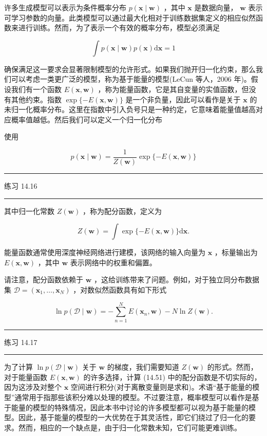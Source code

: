 \documentclass[10pt]{report}
\newcommand{\HRule}{\begin{center}\rule{0.9\linewidth}{0.2mm}\end{center}}
\begin{document}
许多生成模型可以表示为条件概率分布 \(p\left( {\mathbf{x} \mid  \mathbf{w}}\right)\) ，其中 \(\mathbf{x}\) 是数据向量， \(\mathbf{w}\) 表示可学习参数的向量。此类模型可以通过最大化相对于训练数据集定义的相应似然函数来进行训练。然而，为了表示一个有效的概率分布，模型必须满足

\[
\int p\left( {\mathbf{x} \mid  \mathbf{w}}\right) p\left( \mathbf{x}\right) \mathrm{d}\mathbf{x} = 1 \tag{14.49}
\]

确保满足这一要求会显著限制模型的允许形式。如果我们抛开归一化约束，那么我们可以考虑一类更广泛的模型，称为基于能量的模型(LeCun 等人，2006 年)。假设我们有一个函数 \(E\left( {\mathbf{x},\mathbf{w}}\right)\) ，称为能量函数，它是其自变量的实值函数，但没有其他约束。指数 \(\exp \{  - E\left( {\mathbf{x},\mathbf{w}}\right) \}\) 是一个非负量，因此可以看作是关于 \(\mathbf{x}\) 的未归一化概率分布。这里在指数中引入负号只是一种约定，它意味着能量值越高对应概率值越低。然后我们可以定义一个归一化分布

使用

\[
p\left( {\mathbf{x} \mid  \mathbf{w}}\right)  = \frac{1}{Z\left( \mathbf{w}\right) }\exp \{  - E\left( {\mathbf{x},\mathbf{w}}\right) \}  \tag{14.50}
\]

\HRule

练习 14.16

\HRule

其中归一化常数 \(Z\left( \mathbf{w}\right)\) ，称为配分函数，定义为

\[
Z\left( \mathbf{w}\right)  = \int \exp \{  - E\left( {\mathbf{x},\mathbf{w}}\right) \} \mathrm{d}\mathbf{x}. \tag{14.51}
\]

能量函数通常使用深度神经网络进行建模，该网络的输入向量为 \(\mathbf{x}\) ，标量输出为 \(E\left( {\mathbf{x},\mathbf{w}}\right)\) ，其中 \(\mathbf{w}\) 表示网络中的权重和偏置。

请注意，配分函数依赖于 \(\mathbf{w}\) ，这给训练带来了问题。例如，对于独立同分布数据集 \(\mathcal{D} = \left( {{\mathbf{x}}_{1},\ldots ,{\mathbf{x}}_{N}}\right)\) ，对数似然函数具有如下形式

\[
\ln p\left( {\mathcal{D} \mid  \mathbf{w}}\right)  =  - \mathop{\sum }\limits_{{n = 1}}^{N}E\left( {{\mathbf{x}}_{n},\mathbf{w}}\right)  - N\ln Z\left( \mathbf{w}\right) . \tag{14.52}
\]

\HRule

练习 14.17

\HRule

为了计算 \(\ln p\left( {\mathcal{D} \mid  \mathbf{w}}\right)\) 关于 \(\mathbf{w}\) 的梯度，我们需要知道 \(Z\left( \mathbf{w}\right)\) 的形式。然而，对于能量函数 \(E\left( {\mathbf{x},\mathbf{w}}\right)\) 的许多选择，计算 (14.51) 中的配分函数是不切实际的，因为这涉及对整个 \(\mathbf{x}\) 空间进行积分(对于离散变量则是求和)。术语“基于能量的模型”通常用于指那些该积分难以处理的模型。不过要注意，概率模型可以看作是基于能量的模型的特殊情况，因此本书中讨论的许多模型都可以视为基于能量的模型。因此，基于能量的模型的一大优势在于其灵活性，即它们绕过了归一化的要求。然而，相应的一个缺点是，由于归一化常数未知，它们可能更难训练。
\end{document}
